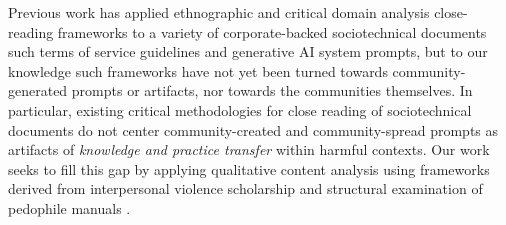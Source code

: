 Previous work has applied ethnographic \citep{udupa_prompt_2026} and critical domain analysis \citep{kopf_content_2019, kopf_corporate_2024} close-reading frameworks to a variety of corporate-backed sociotechnical documents such terms of service guidelines and generative AI system prompts, but to our knowledge such frameworks have not yet been turned towards community-generated prompts or artifacts, nor towards the communities themselves. In particular, existing critical methodologies for close reading of sociotechnical documents do not center  community-created and community-spread prompts as artifacts of \textit{knowledge and practice transfer} within harmful contexts. Our work seeks to fill this gap by applying qualitative content analysis using frameworks derived from interpersonal violence scholarship \citep{stark_coercive_2023} and structural examination of pedophile manuals \cite{blalock_content_2022}.